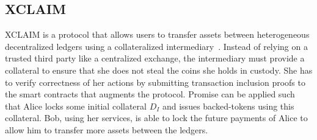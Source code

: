 \documentclass[runningheads]{llncs}
\newcommand{\sys}{Promise\xspace}
\newcommand{\toaza}[1]{\todo[linecolor=blue,backgroundcolor=blue!25,bordercolor=blue,inline,caption={}]{Todo for Alexei: #1}}
\begin{document}
\subsection{XCLAIM}

XCLAIM is a protocol that allows users to transfer assets between heterogeneous decentralized ledgers using a collateralized intermediary~\cite{Zamyatin2019XCLAIM}.
Instead of relying on a trusted third party like a centralized exchange, the intermediary must provide a collateral to ensure that she does not steal the coins she holds in custody.
She has to verify correctness of her actions by submitting transaction inclusion proofs to the smart contracts that augments the protocol.
\sys can be applied such that Alice locks some initial collateral $D_I$ and issues backed-tokens using this collateral.
Bob, using her services, is able to lock the future payments of Alice to allow him to transfer more assets between the ledgers.








\end{document}
